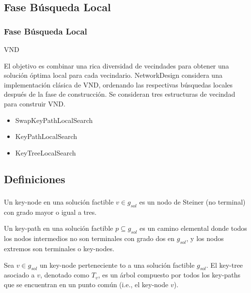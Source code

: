 \subsection{Fase Búsqueda Local}
\begin{frame}\frametitle{Fase Búsqueda Local}
\begin{block}{VND}
\begin{small}
El objetivo es combinar una rica diversidad de vecindades para obtener una solución óptima local para cada vecindario. NetworkDesign considera una implementación clásica de VND, ordenando las respectivas búsquedas locales después de la fase de construcción. Se consideran tres estructuras de vecindad para construir VND.
\begin{itemize}
 \item SwapKeyPathLocalSearch
 \item KeyPathLocalSearch
 \item KeyTreeLocalSearch
\end{itemize} 
\end{small}
\end{block}
\end{frame}

\subsection{Definiciones}
\begin{frame}\frametitle{}
\begin{definition}
Un key-node en una solución factible $v \in g_{sol}$ es un nodo de Steiner (no terminal) con grado mayor o igual a tres.
\end{definition}
\begin{definition}
Un key-path en una solución factible $p \subseteq g_{sol}$ es un camino elemental 
donde todos los nodos intermedios no son terminales con grado dos en $g_{sol}$, 
y los nodos extremos son terminales o key-nodes.
\end{definition}
\begin{definition}
Sea $v \in g_{sol}$ un key-node perteneciente to a una solución factible $g_{sol}$. 
El key-tree asociado a $v$, denotado como $T_v$, es un árbol compuesto por todos los 
key-paths que se encuentran en un punto común (i.e., el key-node $v$).
\end{definition}
\end{frame}


